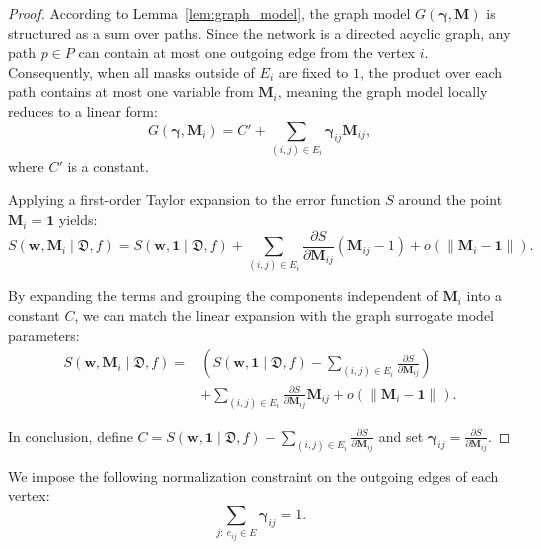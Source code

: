 \documentclass[runningheads]{llncs}
\begin{document}
\begin{proof}
According to Lemma~\ref{lem:graph_model}, the graph model $G(\boldsymbol{\gamma}, \mathbf{M})$ is structured as a sum over paths. Since the network is a directed acyclic graph, any path $p \in P$ can contain at most one outgoing edge from the vertex $i$. Consequently, when all masks outside of $E_i$ are fixed to $1$, the product over each path contains at most one variable from $\mathbf{M}_i$, meaning the graph model locally reduces to a linear form:
\begin{equation}
G(\boldsymbol{\gamma}, \mathbf{M}_i) = C' + \sum_{(i,j) \in E_i} \boldsymbol{\gamma}_{ij} \mathbf{M}_{ij},
\end{equation}
where $C'$ is a constant.

Applying a first-order Taylor expansion to the error function $S$ around the point $\mathbf{M}_i = \mathbf{1}$ yields:
\begin{equation}
S(\mathbf{w}, \mathbf{M}_i \mid \mathfrak{D}, f) = S(\mathbf{w}, \mathbf{1} \mid \mathfrak{D}, f) + \sum_{(i,j) \in E_i} \frac{\partial S}{\partial \mathbf{M}_{ij}} (\mathbf{M}_{ij} - 1) + o(\|\mathbf{M}_i - \mathbf{1}\|).
\end{equation}

By expanding the terms and grouping the components independent of $\mathbf{M}_i$ into a constant $C$, we can match the linear expansion with the graph surrogate model parameters:
\begin{equation}
\begin{split}
S(\mathbf{w}, \mathbf{M}_i \mid \mathfrak{D}, f) =
&\left( S(\mathbf{w}, \mathbf{1} \mid \mathfrak{D}, f) - \sum_{(i,j) \in E_i} \frac{\partial S}{\partial \mathbf{M}_{ij}} \right)
\\
&+ \sum_{(i,j) \in E_i} \frac{\partial S}{\partial \mathbf{M}_{ij}} \mathbf{M}_{ij} + o(\|\mathbf{M}_i - \mathbf{1}\|).
\end{split}
\end{equation}

In conclusion, define $C = S(\mathbf{w}, \mathbf{1} \mid \mathfrak{D}, f) - \sum_{(i,j) \in E_i} \frac{\partial S}{\partial \mathbf{M}_{ij}}$ and set $\boldsymbol{\gamma}_{ij} = \frac{\partial S}{\partial \mathbf{M}_{ij}}$.
\end{proof}

\begin{proposition}
We impose the following normalization constraint on the outgoing edges of each vertex:
\begin{equation}
\sum_{j:\ e_{ij}\in E}\boldsymbol{\gamma}_{ij}=1.
\end{equation}
\end{proposition}
\end{document}
